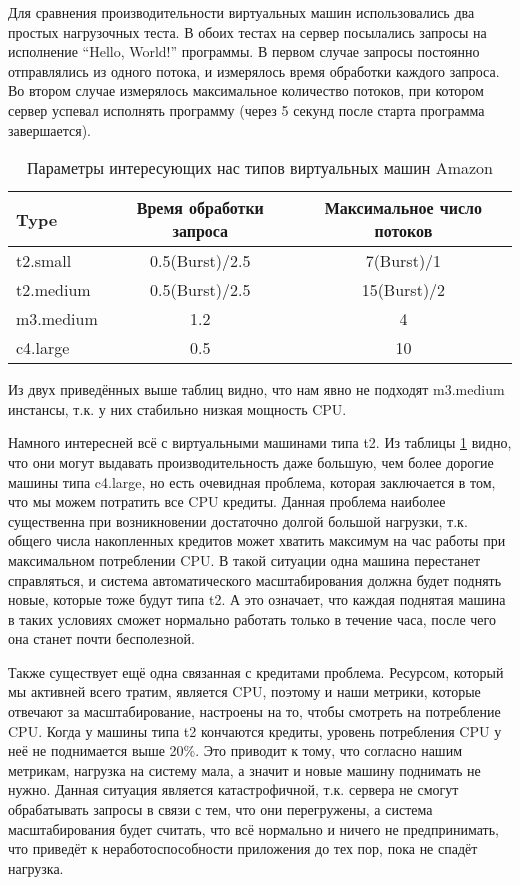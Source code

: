	Для сравнения производительности виртуальных машин использовались два простых нагрузочных теста. В обоих тестах на сервер посылались запросы на исполнение ``Hello, World!'' программы. В первом случае запросы постоянно отправлялись из одного потока, и измерялось время обработки каждого запроса. Во втором случае измерялось максимальное количество потоков, при котором сервер успевал исполнять программу (через 5 секунд после старта программа завершается).
	
\begin{table}[ht]
	\centering
	\begin{tabular}{l|c|c}
		Type      & Время обработки запроса    & Максимальное число потоков\\ \hline
		t2.small  & 0.5(Burst)/2.5             & 7(Burst)/1  \\ \hline
		t2.medium & 0.5(Burst)/2.5             & 15(Burst)/2 \\ \hline
		m3.medium & 1.2                        & 4           \\ \hline
		c4.large  & 0.5                        & 10          \\
	\end{tabular}
	\caption{Параметры интересующих нас типов виртуальных машин Amazon}
	\label{table:instance_types_performance}
\end{table}

	Из двух приведённых выше таблиц видно, что нам явно не подходят m3.medium инстансы, т.к. у них стабильно низкая мощность CPU.
	
	Намного интересней всё с виртуальными машинами типа t2. Из таблицы \ref{table:instance_types_performance}	 видно, что они могут выдавать производительность даже большую, чем более дорогие машины типа c4.large, но есть очевидная проблема, которая заключается в том, что мы можем потратить все CPU кредиты. Данная проблема наиболее существенна при возникновении достаточно долгой большой нагрузки, т.к. общего числа накопленных кредитов может хватить максимум на час работы при максимальном потреблении CPU. В такой ситуации одна машина перестанет справляться, и система автоматического масштабирования должна будет поднять новые, которые тоже будут типа t2. А это означает, что каждая поднятая машина в таких условиях сможет нормально работать только в течение часа, после чего она станет почти бесполезной. 
	
	Также существует ещё одна связанная с кредитами проблема. Ресурсом, который мы активней всего тратим, является CPU, поэтому и наши метрики, которые отвечают за масштабирование, настроены на то, чтобы смотреть на потребление CPU. Когда у машины типа t2 кончаются кредиты, уровень потребления CPU у неё не поднимается выше 20\%. Это приводит к тому, что согласно нашим метрикам, нагрузка на систему мала, а значит и новые машину поднимать не нужно. Данная ситуация является катастрофичной, т.к. сервера не смогут обрабатывать запросы в связи с тем, что они перегружены, а система масштабирования будет считать, что всё нормально и ничего не предпринимать, что приведёт к неработоспособности приложения до тех пор, пока не спадёт нагрузка.
	
